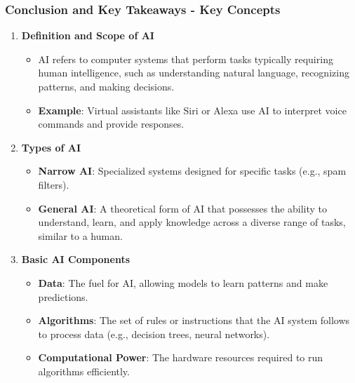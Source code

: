 \documentclass[aspectratio=169]{beamer}
\begin{document}
\begin{frame}[fragile]
    \frametitle{Conclusion and Key Takeaways - Key Concepts}
    \begin{enumerate}
        \item \textbf{Definition and Scope of AI}
            \begin{itemize}
                \item AI refers to computer systems that perform tasks typically requiring human intelligence, such as understanding natural language, recognizing patterns, and making decisions.
                \item \textbf{Example}: Virtual assistants like Siri or Alexa use AI to interpret voice commands and provide responses.
            \end{itemize}
        \item \textbf{Types of AI}
            \begin{itemize}
                \item \textbf{Narrow AI}: Specialized systems designed for specific tasks (e.g., spam filters).
                \item \textbf{General AI}: A theoretical form of AI that possesses the ability to understand, learn, and apply knowledge across a diverse range of tasks, similar to a human.
            \end{itemize}
        \item \textbf{Basic AI Components}
            \begin{itemize}
                \item \textbf{Data}: The fuel for AI, allowing models to learn patterns and make predictions.
                \item \textbf{Algorithms}: The set of rules or instructions that the AI system follows to process data (e.g., decision trees, neural networks).
                \item \textbf{Computational Power}: The hardware resources required to run algorithms efficiently.
            \end{itemize}
    \end{enumerate}
\end{frame}
\end{document}
